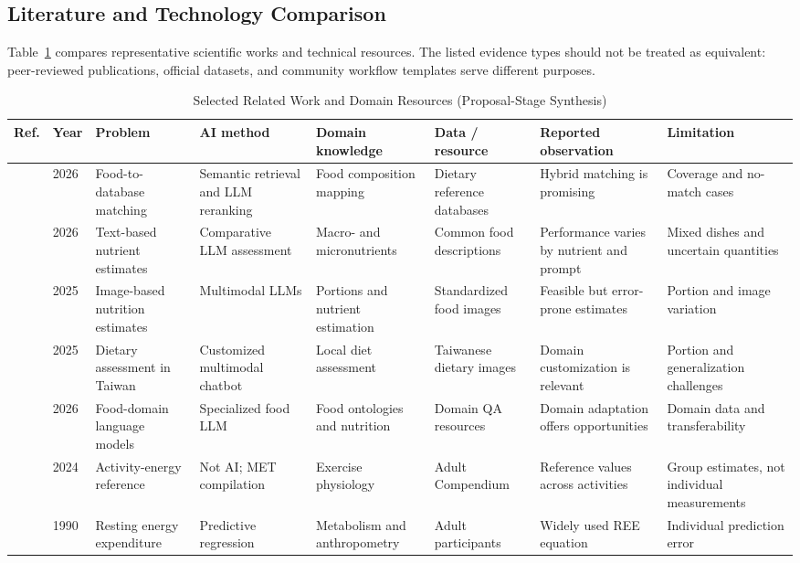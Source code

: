 \documentclass[journal,10pt]{IEEEtran}
\begin{document}
\subsection{Literature and Technology Comparison}
Table~\ref{tab:related} compares representative scientific works and technical resources. The listed evidence types should not be treated as equivalent: peer-reviewed publications, official datasets, and community workflow templates serve different purposes.
\begin{table}[!t]
\caption{Selected Related Work and Domain Resources (Proposal-Stage Synthesis)}
\label{tab:related}
\centering
\footnotesize
\setlength{\tabcolsep}{3.2pt}
\renewcommand{\arraystretch}{1.16}
\begin{tabularx}{\textwidth}{@{}p{0.45cm}p{0.65cm}XXXXXX@{}}
\toprule
Ref. & Year & Problem & AI method & Domain knowledge & Data / resource & Reported observation & Limitation\\
\midrule
\cite{lemay} & 2026 & Food-to-database matching & Semantic retrieval and LLM reranking & Food composition mapping & Dietary reference databases & Hybrid matching is promising & Coverage and no-match cases\\
\cite{nutrients} & 2026 & Text-based nutrient estimates & Comparative LLM assessment & Macro- and micronutrients & Common food descriptions & Performance varies by nutrient and prompt & Mixed dishes and uncertain quantities\\
\cite{imageeval} & 2025 & Image-based nutrition estimates & Multimodal LLMs & Portions and nutrient estimation & Standardized food images & Feasible but error-prone estimates & Portion and image variation\\
\cite{diabot} & 2025 & Dietary assessment in Taiwan & Customized multimodal chatbot & Local diet assessment & Taiwanese dietary images & Domain customization is relevant & Portion and generalization challenges\\
\cite{foody} & 2026 & Food-domain language models & Specialized food LLM & Food ontologies and nutrition & Domain QA resources & Domain adaptation offers opportunities & Domain data and transferability\\
\cite{compendium} & 2024 & Activity-energy reference & Not AI; MET compilation & Exercise physiology & Adult Compendium & Reference values across activities & Group estimates, not individual measurements\\
\cite{mifflin} & 1990 & Resting energy expenditure & Predictive regression & Metabolism and anthropometry & Adult participants & Widely used REE equation & Individual prediction error\\
\bottomrule
\end{tabularx}
\end{table}
\end{document}
